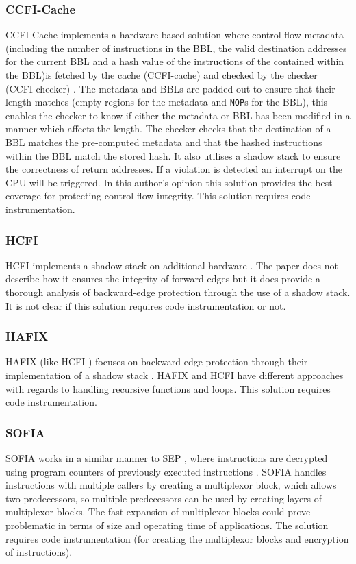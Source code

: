 \subsubsection{CCFI-Cache}
CCFI-Cache implements a hardware-based solution where control-flow metadata (including the number of instructions in the BBL, the valid destination addresses for the current BBL and a hash value of the instructions of the contained within the BBL)is fetched by the cache (CCFI-cache) and checked by the checker (CCFI-checker) \cite{Danger2018}. The metadata and BBLs are padded out to ensure that their length matches (empty regions for the metadata and \verb|NOP|s for the BBL), this enables the checker to know if either the metadata or BBL has been modified in a manner which affects the length. The checker checks that the destination of a BBL matches the pre-computed metadata and that the hashed instructions within the BBL match the stored hash. It also utilises a shadow stack to ensure the correctness of return addresses. If a violation is detected an interrupt on the CPU will be triggered. In this author's opinion this solution provides the best coverage for protecting control-flow integrity. This solution requires code instrumentation.

\subsubsection{HCFI}
HCFI implements a shadow-stack on additional hardware \cite{Danger2018}. The paper does not describe how it ensures the integrity of forward edges but it does provide a thorough analysis of backward-edge protection through the use of a shadow stack. It is not clear if this solution requires code instrumentation or not.

\subsubsection{HAFIX}
HAFIX (like HCFI \cite{Danger2018}) focuses on backward-edge protection through their implementation of a shadow stack \cite{Davi2015}. HAFIX and HCFI have different approaches with regards to handling recursive functions and loops. This solution requires code instrumentation.

\subsubsection{SOFIA}
SOFIA works in a similar manner to SEP \cite{Lee2019}, where instructions are decrypted using program counters of previously executed instructions \cite{Davi2015}. SOFIA handles instructions with multiple callers by creating a multiplexor block, which allows two predecessors, so multiple predecessors can  be used by creating layers of multiplexor blocks. The fast expansion of multiplexor blocks could prove problematic in terms of size and operating time of applications. The solution requires code instrumentation (for creating the multiplexor blocks and encryption of instructions).


